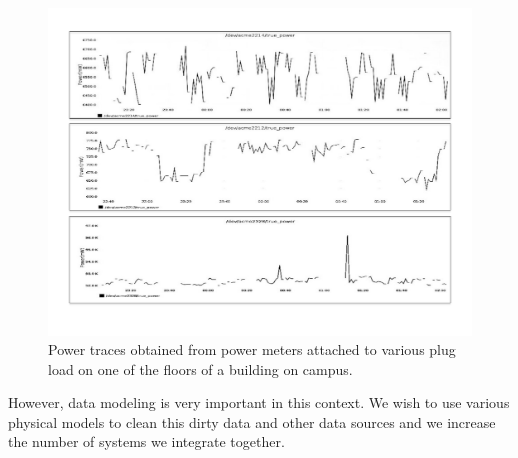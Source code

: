 \begin{figure}[htb!]
\begin{center}
\includegraphics[scale=0.33]{figs/graphs_screen}
\caption{Power traces obtained from power meters attached to various plug load on one of the floors of
a building on campus.}
\label{fig:tsdata}
\end{center}
\end{figure}

However, data modeling is very important in this context.  We wish to use various physical models to clean this dirty data and
other data sources and we increase the number of systems we integrate together.









